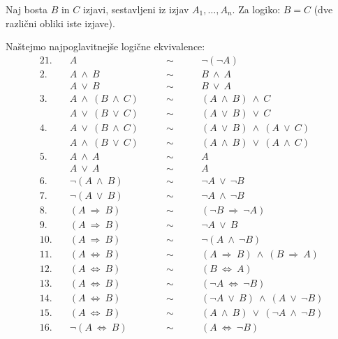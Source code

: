 \documentclass[11pt,paper=b5,DIV=13,headinclude,footinclude]{scrbook}
\def\ali {{~\vee~}}
\def\inn {{~\wedge~}}
\def\sledi {{~\Rightarrow~}}
\def\cee {{~\Leftrightarrow~}}
\begin{document}
Naj bosta $B$ in $C$ izjavi, sestavljeni iz izjav $A_1,\ldots, A_n$.
\iftoggle{long}{
{\color{blue}
Če je izjava $B\cee C$ tavtologija, pravimo, da sta $B$ in $C$ {\em logično ekvivalentni}.
}
}
{
Če je izjava $B\cee C$ tavtologija, pravimo, da sta $B$ in $C$ {\em logično ekvivalentni}.
}
Za logiko: $B = C$ (dve  različni obliki iste izjave).

Naštejmo najpoglavitnejše logične ekvivalence:
\begin{alignat*}{2}
  \text{1.}\quad & A &\qquad\sim\qquad& \neg(\neg A)\\
  \text{2.}\quad & A\inn B &\qquad\sim\qquad& B\inn A\\
                 & A\ali B &\qquad\sim\qquad& B\ali A \\
  \text{3.}\quad & A\inn(B\inn C) &\qquad\sim\qquad& (A\inn B)\inn C\\
                 & A\ali(B\ali C) &\qquad\sim\qquad& (A\ali B)\ali C \\
  \text{4.}\quad & A\ali(B\inn C) &\qquad\sim\qquad& (A\ali B)\inn(A\ali C)\\
                 & A\inn(B\ali C) &\qquad\sim\qquad& (A\inn B)\ali(A\inn C)\\
  \text{5.}\quad & A\inn A &\qquad\sim\qquad& A\\
                 & A\ali A &\qquad\sim\qquad& A\\
  \text{6.}\quad & \neg(A\inn B) &\qquad\sim\qquad& \neg A\ali\neg B\\
  \text{7.}\quad & \neg(A\ali B) &\qquad\sim\qquad& \neg A\inn\neg B\\
  \text{8.}\quad & (A\sledi B) &\qquad\sim\qquad& (\neg B\sledi\neg A)\\
  \text{9.}\quad & (A\sledi B) &\qquad\sim\qquad& \neg A\ali B\\
  \text{10.}\quad & (A\sledi B) &\qquad\sim\qquad& \neg(A\inn\neg B)\\
  \text{11.}\quad & (A\cee B) &\qquad\sim\qquad& (A\sledi B)\inn(B\sledi A)\\
  \text{12.}\quad & (A\cee B) &\qquad\sim\qquad& (B\cee A)\\
  \text{13.}\quad & (A\cee B) &\qquad\sim\qquad& (\neg A\cee\neg B)\\
  \text{14.}\quad & (A\cee B) &\qquad\sim\qquad& (\neg A\ali B)\inn(A\ali\neg B)\\
  \text{15.}\quad & (A\cee B) &\qquad\sim\qquad& (A\inn B)\ali(\neg A\inn\neg B)\\
  \text{16.}\quad & \neg(A\cee B) &\qquad\sim\qquad& (A\cee\neg B)
\end{alignat*}
\end{document}

